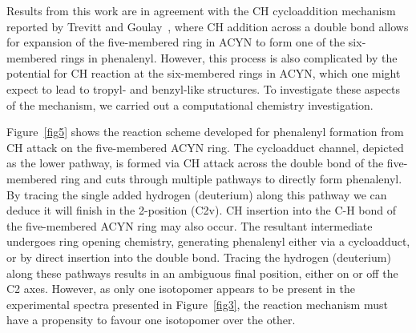 \documentclass[journal=jacsat,manuscript=article,layout=onecolumn]{achemso}
\begin{document}
Results from this work are in agreement with the CH cycloaddition mechanism reported by Trevitt and Goulay~\cite{tre16}, where CH addition across a double bond allows for expansion of the five-membered ring in ACYN to form one of the six-membered rings in phenalenyl. However, this process is also complicated by the potential for CH reaction at the six-membered rings in ACYN, which one might expect to lead to tropyl- and benzyl-like structures. To investigate these aspects of the mechanism, we carried out a computational chemistry investigation.



Figure~\ref{fig5} shows the reaction scheme developed for phenalenyl formation from CH attack on the five-membered ACYN ring. The cycloadduct channel, depicted as the lower pathway, is formed via CH attack across the double bond of the five-membered ring and cuts through multiple pathways to directly form phenalenyl. By tracing the single added hydrogen (deuterium) along this pathway we can deduce it will finish in the 2-position (C2v). CH insertion into the C-H bond of the five-membered ACYN ring may also occur. The resultant intermediate undergoes ring opening chemistry, generating phenalenyl either via a cycloadduct, or by direct insertion into the double bond. Tracing the hydrogen (deuterium) along these pathways results in an ambiguous final position, either on or off the C2 axes. However, as only one isotopomer appears to be present in the experimental spectra presented in Figure~\ref{fig3}, the reaction mechanism must have a propensity to favour one isotopomer over the other. 



\end{document}
